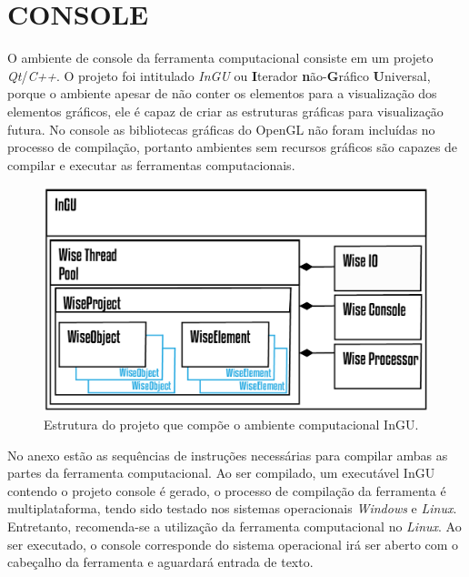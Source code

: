 \documentclass[a4paper,12pt]{monografia}
\theoremstyle{plain}
\theoremstyle{definition}
\theoremstyle{remark}
\begin{document}
\section{CONSOLE}\label{sec:console}

O ambiente de console da ferramenta computacional consiste em um projeto \textit{Qt}/\textit{C++}. O projeto foi intitulado \textit{InGU} ou \textbf{I}terador \textbf{n}ão-\textbf{G}ráfico \textbf{U}niversal, porque o ambiente apesar de não conter os elementos para a visualização dos elementos gráficos, ele é capaz de criar as estruturas gráficas para visualização futura.  No console as bibliotecas gráficas do OpenGL não foram incluídas no processo de compilação, portanto ambientes sem recursos gráficos são capazes de compilar e executar as ferramentas computacionais.

\begin{figure}[!htbp]
	\centering
	\includegraphics[width=\linewidth]{Figures/InGU.png}
	\caption{Estrutura do projeto que compõe o ambiente computacional InGU.}
	\label{fig10:console}
\end{figure}

No anexo estão as sequências de instruções necessárias para compilar ambas as partes da ferramenta computacional. Ao ser compilado, um executável InGU contendo o projeto console é gerado, o processo de compilação da ferramenta é multiplataforma, tendo sido testado nos sistemas operacionais \textit{Windows} e \textit{Linux}. Entretanto, recomenda-se a utilização da ferramenta computacional no \textit{Linux}. Ao ser executado, o console corresponde do sistema operacional irá ser aberto com o cabeçalho da ferramenta e aguardará entrada de texto.
\end{document}
